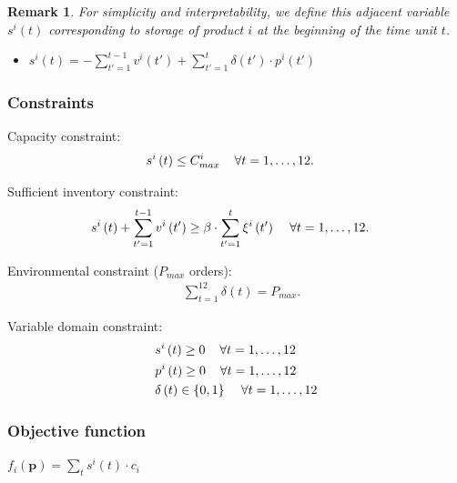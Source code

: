 \documentclass[11pt,twocolumn]{article}
\newtheorem{remark}{Remark}{}
\begin{document}
\begin{remark}
For simplicity and interpretability, we define this adjacent variable $s^{i}\left( t \right) $ corresponding to storage of product $i$ at the beginning of the time unit $t$.
\end{remark}

\begin{itemize}
	\item $s^{i}\left( t \right) = - \sum_{t'=1}^{t-1} v^{i}\left( t' \right)  + \sum_{t'=1}^{t} \delta\left( t' \right) \cdot p^{i}\left( t' \right)  $
\end{itemize}

\subsubsection{Constraints}

Capacity constraint:
\begin{align*}
	&s^{i}\left( t \right) \le C^{i}_{max} \hspace{4mm} \forall t = 1,\ldots,12
.\end{align*}

Sufficient inventory constraint:
\begin{align*}
	&s^{i}\left( t \right) + \sum_{t'=1}^{t-1} v^{i}\left( t' \right) \ge \beta\cdot \sum_{t'=1}^{t} \xi^{i}\left( t' \right) \hspace{4mm} \forall t = 1,\ldots,12
.\end{align*}


Environmental constraint ($P_{max}$ orders):
\begin{align*}
	&\sum_{t=1}^{12} \delta\left( t \right) = P_{max}
.\end{align*}

Variable domain constraint:
\begin{align*}
	&s^{i}\left( t \right) \ge 0 \hspace{4mm} \forall t = 1,\ldots,12\\
	&p^{i}\left( t \right) \ge 0 \hspace{4mm} \forall t = 1,\ldots,12\\
	&\delta \left( t \right) \in  \left\{ 0,1 \right\} \hspace{4mm} \forall t = 1,\ldots,12 
\end{align*}

\subsubsection{Objective function}
\hspace{4mm} $ f_i(\mathbf{p}) = \sum_{t}^{} s^{i}\left( t \right) \cdot c_i$
\end{document}
